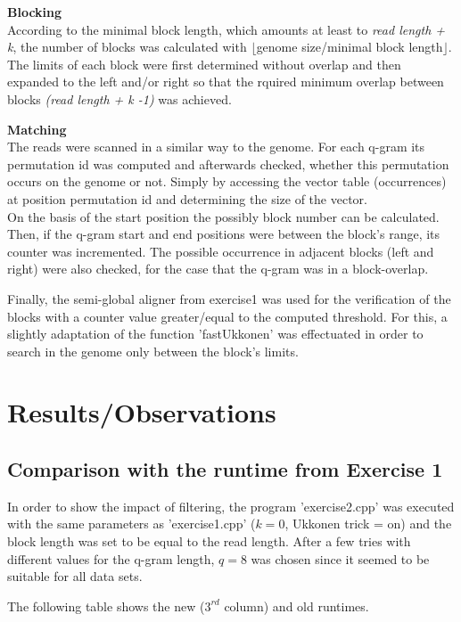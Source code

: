 \documentclass[11pt, notitlepage]{scrartcl}
\begin{document}
\textbf{Blocking}\\
According to the minimal block length, which amounts at least to \textit{read length + k}, the number of blocks was calculated with $\lfloor$genome size/minimal block length$\rfloor$. The limits of each block were first determined without overlap and then expanded to the left and/or right so that the rquired minimum overlap between blocks \textit{(read length + k -1)} was achieved.

\textbf{Matching}\\
The reads were scanned in a similar way to the genome. For each q-gram its permutation id was computed and afterwards checked, whether this permutation occurs on the genome or not. Simply by accessing the vector table (occurrences) at position permutation id and determining the size of the vector.\\
On the basis of the start position the possibly block number can be calculated. Then, if the q-gram start and end positions were between the block's range, its counter was incremented. The possible occurrence in adjacent blocks (left and right) were also checked, for the case that the q-gram was in a block-overlap.

Finally, the semi-global aligner from exercise1 was used for the verification of the blocks with a counter value greater/equal to the computed threshold. For this, a slightly adaptation of the function 'fastUkkonen' was effectuated in order to search in the genome only between the block's limits. 

\section{Results/Observations}
\subsection{Comparison with the runtime from Exercise 1}
In order to show the impact of filtering, the program 'exercise2.cpp' was executed with the same parameters as 'exercise1.cpp' ($k=0$, Ukkonen trick = on) and the block length was set to be equal to the read length. After a few tries with different values for the q-gram length, $q=8$ was chosen since it seemed to be suitable for all data sets.

The following table shows the new  ($3^{rd}$ column) and old runtimes.
\end{document}
